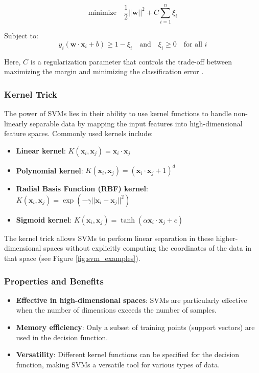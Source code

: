 \documentclass[english,11pt,a4paper,titlepage]{article}
\begin{document}
	\begin{equation*}
		\text{minimize} \quad \frac{1}{2} ||\mathbf{w}||^2 + C \sum_{i=1}^{n} \xi_i
	\end{equation*}
	
	Subject to:
	\begin{equation*}
		y_i (\mathbf{w} \cdot \mathbf{x}_i + b) \geq 1 - \xi_i \quad \text{and} \quad \xi_i \geq 0 \quad \text{for all } i
	\end{equation*}
	
	Here, \( C \) is a regularization parameter that controls the trade-off between maximizing the margin and minimizing the classification error \cite{hastieElementsStatisticalLearning2009,sohilIntroductionStatisticalLearning2022}.
	
	\subsubsection*{Kernel Trick}
	The power of SVMs lies in their ability to use kernel functions to handle non-linearly separable data by mapping the input features into high-dimensional feature spaces. Commonly used kernels include:
	
	\begin{itemize}
		\item \textbf{Linear kernel}: \( K(\mathbf{x}_i, \mathbf{x}_j) = \mathbf{x}_i \cdot \mathbf{x}_j \)
		\item \textbf{Polynomial kernel}: \( K(\mathbf{x}_i, \mathbf{x}_j) = (\mathbf{x}_i \cdot \mathbf{x}_j + 1)^d \)
		\item \textbf{Radial Basis Function (RBF) kernel}: \( K(\mathbf{x}_i, \mathbf{x}_j) = \exp(-\gamma ||\mathbf{x}_i - \mathbf{x}_j||^2) \)
		\item \textbf{Sigmoid kernel}: \( K(\mathbf{x}_i, \mathbf{x}_j) = \tanh(\alpha \mathbf{x}_i \cdot \mathbf{x}_j + c) \)
	\end{itemize}
	
	The kernel trick allows SVMs to perform linear separation in these higher-dimensional spaces without explicitly computing the coordinates of the data in that space \cite{sohilIntroductionStatisticalLearning2022,hastieElementsStatisticalLearning2009} (see Figure \ref{fig:svm_examples}).
	
	\subsubsection*{Properties and Benefits}
	\begin{itemize}
		\item \textbf{Effective in high-dimensional spaces}: SVMs are particularly effective when the number of dimensions exceeds the number of samples.
		\item \textbf{Memory efficiency}: Only a subset of training points (support vectors) are used in the decision function.
		\item \textbf{Versatility}: Different kernel functions can be specified for the decision function, making SVMs a versatile tool for various types of data.
	\end{itemize}
	
\end{document}
